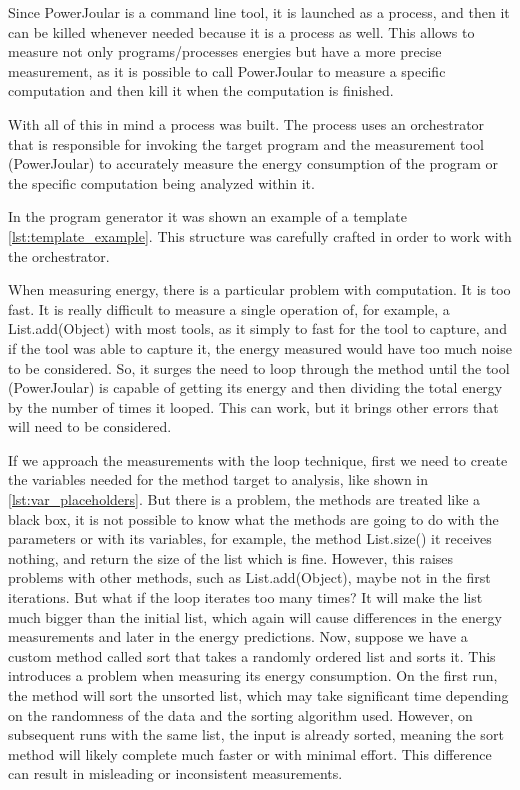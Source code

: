 Since PowerJoular is a command line tool, it is launched as a process, and then it can be killed whenever needed because it is a process as well. This allows to measure not only programs/processes energies but have a more precise measurement, as it is possible to call PowerJoular to measure a specific computation and then kill it when the computation is finished.

With all of this in mind a process was built. The process uses an orchestrator that is responsible for invoking the target program and the measurement tool (PowerJoular) to accurately measure the energy consumption of the program or the specific computation being analyzed within it.

In the program generator it was shown an example of a template \ref{lst:template_example}. This structure was carefully crafted in order to work with the orchestrator.



When measuring energy, there is a particular problem with computation. It is too fast. It is really difficult to measure a single operation of, for example, a List.add(Object) with most tools, as it simply to fast for the tool to capture, and if the tool was able to capture it, the energy measured would have too much noise to be considered. So, it surges the need to loop through the method until the tool (PowerJoular) is capable of getting its energy and then dividing the total energy by the number of times it looped. This can work, but it brings other errors that will need to be considered.

If we approach the measurements with the loop technique, first we need to create the variables needed for the method target to analysis, like shown in \ref{lst:var_placeholders}. But there is a problem, the methods are treated like a black box, it is not possible to know what the methods are going to do with the parameters or with its variables, for example, the method List.size() it receives nothing, and return the size of the list which is fine. However, this raises problems with other methods, such as List.add(Object), maybe not in the first iterations. But what if the loop iterates too many times? It will make the list much bigger than the initial list, which again will cause differences in the energy measurements and later in the energy predictions. 
Now, suppose we have a custom method called sort that takes a randomly ordered list and sorts it. This introduces a problem when measuring its energy consumption. On the first run, the method will sort the unsorted list, which may take significant time depending on the randomness of the data and the sorting algorithm used. However, on subsequent runs with the same list, the input is already sorted, meaning the sort method will likely complete much faster or with minimal effort. This difference can result in misleading or inconsistent measurements.

